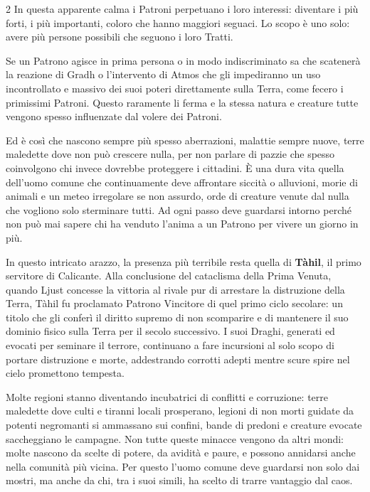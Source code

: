 \begin{multicols}{2}
In questa apparente calma i Patroni perpetuano i loro interessi: diventare i più forti, i più importanti, coloro che hanno maggiori seguaci. Lo scopo è uno solo: avere più persone possibili che seguono i loro Tratti.

Se un Patrono agisce in prima persona o in modo indiscriminato sa che scatenerà la reazione di Gradh o l'intervento di Atmos che gli impediranno un uso incontrollato e massivo dei suoi poteri direttamente sulla Terra, come fecero i primissimi Patroni. Questo raramente li ferma e la stessa natura e creature tutte vengono spesso influenzate dal volere dei Patroni.

Ed è così che nascono sempre più spesso aberrazioni, malattie sempre nuove, terre maledette dove non può crescere nulla, per non parlare di pazzie che spesso coinvolgono chi invece dovrebbe proteggere i cittadini. È una dura vita quella dell'uomo comune che continuamente deve affrontare siccità o alluvioni, morie di animali e un meteo irregolare se non assurdo, orde di creature venute dal nulla che vogliono solo sterminare tutti. Ad ogni passo deve guardarsi intorno perché non può mai sapere chi ha venduto l'anima a un Patrono per vivere un giorno in più.

In questo intricato arazzo, la presenza più terribile resta quella di \textbf{Tàhil}, il primo servitore di Calicante. Alla conclusione del cataclisma della Prima Venuta, quando Ljust concesse la vittoria al rivale pur di arrestare la distruzione della Terra, Tàhil fu proclamato Patrono Vincitore di quel primo ciclo secolare: un titolo che gli conferì il diritto supremo di non scomparire e di mantenere il suo dominio fisico sulla Terra per il secolo successivo. I suoi Draghi, generati ed evocati per seminare il terrore, continuano a fare incursioni al solo scopo di portare distruzione e morte, addestrando corrotti adepti mentre scure spire nel cielo promettono tempesta.

Molte regioni stanno diventando incubatrici di conflitti e corruzione: terre maledette dove culti e tiranni locali prosperano, legioni di non morti guidate da potenti negromanti si ammassano sui confini, bande di predoni e creature evocate saccheggiano le campagne. Non tutte queste minacce vengono da altri mondi: molte nascono da scelte di potere, da avidità e paure, e possono annidarsi anche nella comunità più vicina. Per questo l'uomo comune deve guardarsi non solo dai mostri, ma anche da chi, tra i suoi simili, ha scelto di trarre vantaggio dal caos.


\end{multicols}
